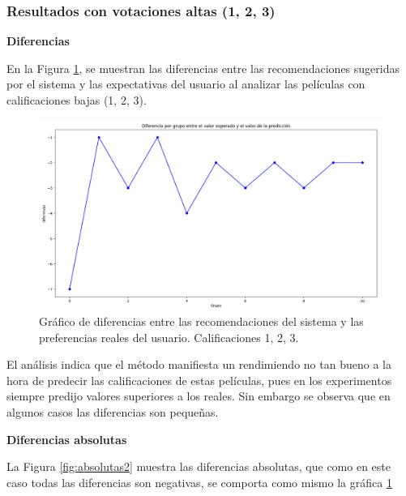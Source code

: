 \documentclass[runningheads,a4paper]{llncs}
\begin{document}
\subsubsection{Resultados con votaciones altas (1, 2, 3)\\}

\textbf{Diferencias}

En la Figura \ref{fig:diferencias2}, se muestran las diferencias entre las recomendaciones sugeridas por el sistema y las expectativas del usuario al analizar las películas con calificaciones bajas (1, 2, 3). 

\begin{figure}[h]
    \centering
    \includegraphics[width=\columnwidth]{assets/Diferencias123.png}
    \caption{Gráfico de diferencias entre las recomendaciones del sistema y las preferencias reales del usuario. Calificaciones 1, 2, 3.}
    \label{fig:diferencias2}
\end{figure}

El análisis indica que el método manifiesta un rendimiendo no tan bueno a la hora de predecir las calificaciones de estas películas, pues en los experimentos siempre predijo valores superiores a los reales. Sin embargo se observa que en algunos casos las diferencias son pequeñas.

\textbf{Diferencias absolutas}

La Figura \ref{fig:absolutas2} muestra las diferencias absolutas, que como en este caso todas las diferencias son negativas, se comporta como mismo la gráfica \ref{fig:diferencias2}
\end{document}
